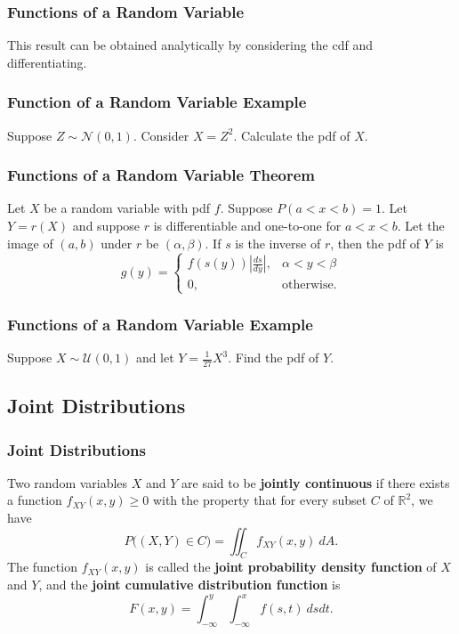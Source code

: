 \documentclass{beamer}
\begin{document}
\begin{frame}
\frametitle{Functions of a Random Variable}
This result can be obtained analytically by considering the cdf and differentiating. 
\end{frame}

\begin{frame}[t]
\frametitle{Function of a Random Variable Example}
\begin{Example}
Suppose $Z\sim{\mathcal{N}(0, 1)}$. Consider $X = Z^2$. Calculate the pdf of $X$.
\end{Example}

\end{frame}

\begin{frame}
\frametitle{Functions of a Random Variable Theorem}

\begin{Theorem}
Let $X$ be a random variable with pdf $f$. Suppose $P(a < x < b) = 1$. Let $Y = r(X)$ and suppose $r$ is differentiable and one-to-one for $a < x < b$. Let the image of $(a, b)$ under $r$ be $(\alpha, \beta)$. If $s$ is the inverse of $r$, then the pdf of $Y$ is
$$
g(y) = \begin{cases} f\left(s(y)\right)\left|\frac{ds}{dy}\right|,	&	\alpha < y <\beta\\ 0,	&	\text{otherwise.}\end{cases}
$$
\end{Theorem}

\end{frame}

\begin{frame}[t]
\frametitle{Functions of a Random Variable Example}
\begin{Example}
Suppose $X\sim{\mathcal{U}(0, 1)}$ and let $Y = \frac{1}{27}X^3$. Find the pdf of $Y$.
\end{Example}

\end{frame}


\subsection{Joint Distributions} 

\begin{frame}

\frametitle{Joint Distributions}
\begin{Definition}
Two random variables $X$ and $Y$ are said to be {\bf jointly continuous} if there exists a function $f_{XY}(x, y) \geq 0$ with the property that for every subset $C$ of $\mathbb{R}^2$, we have
$$
P\Big((X, Y)\in C\Big) = \iint_C f_{XY}(x, y)\ dA.
$$
The function $f_{XY}(x, y)$ is called the {\bf joint probability density function} of $X$ and $Y$, and the {\bf joint cumulative distribution function} is
$$
F(x, y) = \int_{-\infty}^y\int_{-\infty}^x f(s, t)\ dsdt.
$$
\end{Definition}

\end{frame}
\end{document}
